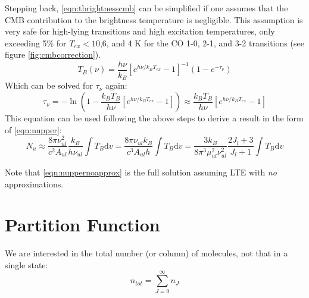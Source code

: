 \documentclass[preprint]{aastex}
\newcommand{\dv}{\ensuremath{\textrm{d}v}}
\begin{document}
Stepping back, \eqref{eqn:tbrightnesscmb} can be simplified if one
assumes that the CMB contribution to the brightness temperature is negligible.
This assumption is very safe for high-lying transitions and high excitation
temperatures, only exceeding 5\% for $T_{ex} < 10$,6, and 4 K for the CO 1-0,
2-1, and 3-2 transitions (see figure \ref{fig:cmbcorrection}).
\begin{equation} 
  \label{eqn:tbrightnesscmb2}
  T_B(\nu) = \frac{h \nu}{k_B} \left[e^{h \nu / k_B T_{ex}} - 1\right]^{-1}  (1-e^{-\tau_\nu})
\end{equation}
Which can be solved for $\tau_\nu$ again:
\begin{equation}
  \tau_\nu = -\ln\left( 1 - \frac{k_B T_B}{h \nu} \left[e^{h \nu / k_B T_{ex}} - 1\right] \right) \approx \frac{k_B T_B}{h \nu} \left[e^{h \nu / k_B T_{ex}} - 1\right]
\end{equation}
This equation can be used following the above steps to derive a result in the form of \eqref{eqn:nupper}:
\begin{equation}
  \label{eqn:nupperapprox}
  N_u \approx \frac{8\pi \nu_{ul}^2 }{c^2 A_{ul} }  \frac{k_B}{h \nu_{ul}} \int T_B \dv
  = \frac{8\pi \nu_{ul} k_B}{c^3 A_{ul} h }  \int T_B \dv
  = \frac{3  k_B }{8 \pi^3 \mu_{ul}^2 \nu_{ul}^2 } \frac{2 J_l + 3}{J_l+1}   \int T_B \dv
\end{equation}


Note that \eqref{eqn:nuppernoapprox} is the full solution assuming LTE with \emph{no} approximations.


%


\section{Partition Function}
We are interested in the total number (or column) of molecules, not that in a single state:
\begin{equation}
  n_{tot} = \sum_{J=0}^\infty n_J
\end{equation}
\end{document}
